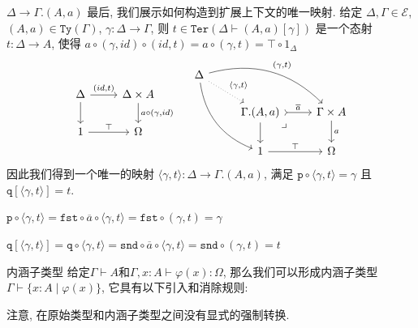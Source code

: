 \documentclass[aspectratio=169,xcolor=dvipsnames]{beamer}
\newcommand\calE{\mathcal{E}}
\newcommand\fst{\mathtt{fst}}
\newcommand\snd{\mathtt{snd}}
\newcommand\Ty{\mathtt{Ty}}
\newcommand\Ter{\mathtt{Ter}}
\newcommand\ttp{\mathtt{p}}
\newcommand\ttq{\mathtt{q}}
\begin{document}
\begin{frame}{$\Delta \to \Gamma.(A,a)$}
  最后, 我们展示如何构造到扩展上下文的唯一映射. 给定 $\Delta,\Gamma\in\calE$, $(A,a)\in\Ty(\Gamma)$, $\gamma:\Delta\to\Gamma$, 则 $t\in\Ter(\Delta\vdash(A,a)[\gamma])$ 是一个态射 $t : \Delta \to A$, 使得 $a\circ(γ, id)\circ(id, t) = a\circ(\gamma,t) = \top\circ1_Δ$
  \[
  \begin{tabular}[t]{lr}
  \begin{tikzcd}
    \Delta \arrow[r,"{(id,t)}"] \arrow[d] & \Delta\times A \arrow[d,"{a\circ(\gamma,id)}"] \\
    1 \arrow[r,"\top"] & \Omega
  \end{tikzcd}
&
  \begin{tikzcd}
\Delta
\arrow[drr, bend left, "{(\gamma,t)}"]
\arrow[ddr, bend right]
\arrow[dr, dotted, "{\langle\gamma,t\rangle}"] & & \\
& \Gamma.(A,a) \arrow[dr,phantom,"{\lrcorner}",very near start] \arrow[r,tail,"{\overline{a}}"] \arrow[d]
& \Gamma\times A \arrow[d, "a"] \\
& 1 \arrow[r, "\top"]
& \Omega
\end{tikzcd}
  \end{tabular} \]
  因此我们得到一个唯一的映射 $⟨γ, t⟩ : Δ → Γ.(A, a)$, 满足 $\ttp \circ ⟨γ, t⟩ = γ$ 且 $\ttq[⟨γ, t⟩] = t$.

  $\ttp\circ\langle\gamma,t\rangle = \fst\circ\overline{a}\circ\langle\gamma,t\rangle = \fst\circ(\gamma,t) = \gamma$

  $\ttq[\langle\gamma,t\rangle] = \ttq\circ\langle\gamma,t\rangle = \snd\circ\overline{a}\circ\langle\gamma,t\rangle=\snd\circ(\gamma,t)=t$
\end{frame}

\begin{frame}{内涵子类型}
  给定$\Gamma\vdash A$和$\Gamma,x:A\vdash\varphi(x):\Omega$, 那么我们可以形成内涵子类型$\Gamma\vdash\{x:A\mid\varphi(x)\}$, 它具有以下引入和消除规则:
  
  注意, 在原始类型和内涵子类型之间没有显式的强制转换.
\end{frame}
\end{document}
